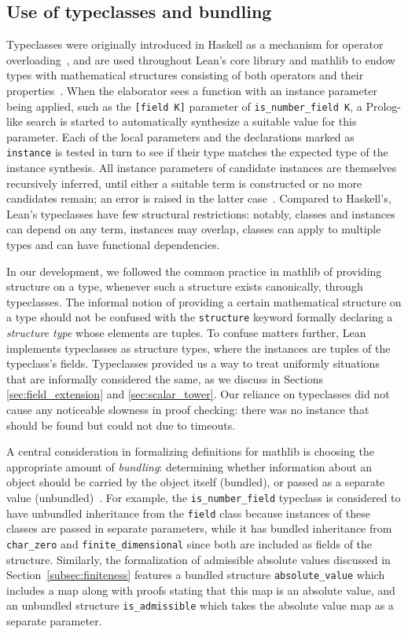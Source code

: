 \documentclass[sn-mathphys]{sn-jnl}%
\newcommand{\lean}[1]{\texttt{#1}\xspace}
\newcommand{\mathlib}{\textsf{mathlib}\xspace}
\begin{document}
\subsection{Use of typeclasses and bundling} \label{sec:typeclasses}
Typeclasses were originally introduced in Haskell as a mechanism for operator overloading~\cite{typeclasses-haskell},
and are used throughout Lean's core library and \mathlib to endow types with mathematical structures consisting of both operators and their properties~\cite{mathlib}.
When the elaborator sees a function with an instance parameter being applied, such as the \lean{[field K]} parameter of \lean{is\_number\_field K}, a Prolog-like search is started to automatically synthesize a suitable value for this parameter.
Each of the local parameters and the declarations marked as \lean{instance} is tested in turn to see if their type matches the expected type of the instance synthesis.
All instance parameters of candidate instances are themselves recursively inferred, until either a suitable term is constructed or no more candidates remain; an error is raised in the latter case~\cite[Section 10]{theorem-proving-in-lean}.
Compared to Haskell's, Lean's typeclasses have few structural restrictions: notably, classes and instances can depend on any term, instances may overlap, classes can apply to multiple types and can have functional dependencies.

In our development, we followed the common practice in \mathlib of providing structure on a type,
whenever such a structure exists canonically, through typeclasses.
The informal notion of providing a certain mathematical structure on a type should not be confused with the \lean{structure} keyword formally declaring a \emph{structure type} whose elements are tuples.
To confuse matters further, Lean implements typeclasses as structure types, where the instances are tuples of the typeclass's fields.
Typeclasses provided us a way to treat uniformly situations that are informally considered the same, as we discuss in Sections \ref{sec:field_extension} and \ref{sec:scalar_tower}.
Our reliance on typeclasses did not cause any noticeable slowness in proof checking:
there was no instance that should be found but could not due to timeouts.

A central consideration in formalizing definitions for \mathlib is choosing the appropriate amount of \emph{bundling}:
determining whether information about an object should be carried by the object itself (bundled), or passed as a separate value (unbundled)~\cite{instance-parameters-mathlib}.
For example, the \lean{is\_number\_field} typeclass is considered to have unbundled inheritance from the \lean{field} class because instances of these classes are passed in separate parameters,
while it has bundled inheritance from \lean{char\_zero} and \lean{finite\_dimensional} since both are included as fields of the structure.
Similarly, the formalization of admissible absolute values discussed in Section~\ref{subsec:finiteness} features a bundled structure \lean{absolute\_value} which includes a map along with proofs stating that this map is an absolute value,
and an unbundled structure \lean{is\_admissible} which takes the absolute value map as a separate parameter.
\end{document}
